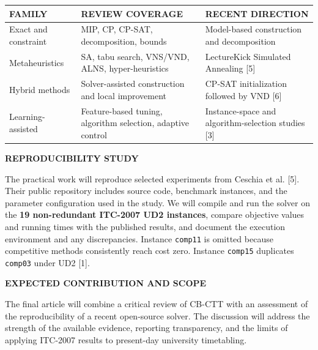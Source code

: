\documentclass[10pt]{article}
\newcommand{\proposalheading}[1]{%
  \vspace{1.8mm}%
  {\color{wine}\sffamily\fontsize{9.8}{11.2}\selectfont\bfseries
  \MakeUppercase{#1}}\par
  \vspace{0.55mm}%
}
\begin{document}
\begin{minipage}[t][0.98\textheight][t]{\textwidth}
\vspace{0.7mm}
\noindent\begin{tabularx}{\linewidth}{@{}F A E@{}}
\toprule[0.65pt]
\color{wine}\sffamily\bfseries FAMILY &
\color{wine}\sffamily\bfseries REVIEW COVERAGE &
\color{wine}\sffamily\bfseries RECENT DIRECTION\\
\midrule[0.45pt]
Exact and constraint & MIP, CP, CP-SAT, decomposition, bounds & Model-based construction and decomposition\\
\midrule[0.35pt]
Metaheuristics & SA, tabu search, VNS/VND, ALNS, hyper-heuristics & LectureKick Simulated Annealing [5]\\
\midrule[0.35pt]
Hybrid methods & Solver-assisted construction and local improvement & CP-SAT initialization followed by VND [6]\\
\midrule[0.35pt]
Learning-assisted & Feature-based tuning, algorithm selection, adaptive control & Instance-space and algorithm-selection studies [3]\\
\bottomrule[0.65pt]
\end{tabularx}

\proposalheading{Reproducibility study}
{\fontsize{9.2}{11}\selectfont\justifying
The practical work will reproduce selected experiments from Ceschia et al. [5]. Their public repository includes source code, benchmark instances, and the parameter configuration used in the study. We will compile and run the solver on the \textbf{19 non-redundant ITC-2007 UD2 instances}, compare objective values and running times with the published results, and document the execution environment and any discrepancies. Instance \texttt{comp11} is omitted because competitive methods consistently reach cost zero. Instance \texttt{comp15} duplicates \texttt{comp03} under UD2 [1].\par}

\proposalheading{Expected contribution and scope}
{\fontsize{9.2}{11}\selectfont\justifying
The final article will combine a critical review of CB-CTT with an assessment of the reproducibility of a recent open-source solver. The discussion will address the strength of the available evidence, reporting transparency, and the limits of applying ITC-2007 results to present-day university timetabling.\par}


\end{minipage}
\end{document}
